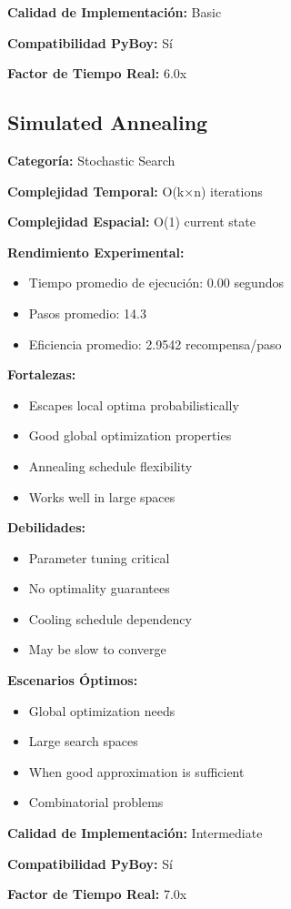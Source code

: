 \textbf{Calidad de Implementación:} Basic

\textbf{Compatibilidad PyBoy:} Sí

\textbf{Factor de Tiempo Real:} 6.0x



\subsection{Simulated Annealing}

\textbf{Categoría:} Stochastic Search

\textbf{Complejidad Temporal:} O(k×n) iterations

\textbf{Complejidad Espacial:} O(1) current state

\textbf{Rendimiento Experimental:}
\begin{itemize}
    \item Tiempo promedio de ejecución: 0.00 segundos
    \item Pasos promedio: 14.3
    \item Eficiencia promedio: 2.9542 recompensa/paso
\end{itemize}

\textbf{Fortalezas:}
\begin{itemize}
    \item Escapes local optima probabilistically
    \item Good global optimization properties
    \item Annealing schedule flexibility
    \item Works well in large spaces
\end{itemize}

\textbf{Debilidades:}
\begin{itemize}
    \item Parameter tuning critical
    \item No optimality guarantees
    \item Cooling schedule dependency
    \item May be slow to converge
\end{itemize}

\textbf{Escenarios Óptimos:}
\begin{itemize}
    \item Global optimization needs
    \item Large search spaces
    \item When good approximation is sufficient
    \item Combinatorial problems
\end{itemize}

\textbf{Calidad de Implementación:} Intermediate

\textbf{Compatibilidad PyBoy:} Sí

\textbf{Factor de Tiempo Real:} 7.0x

